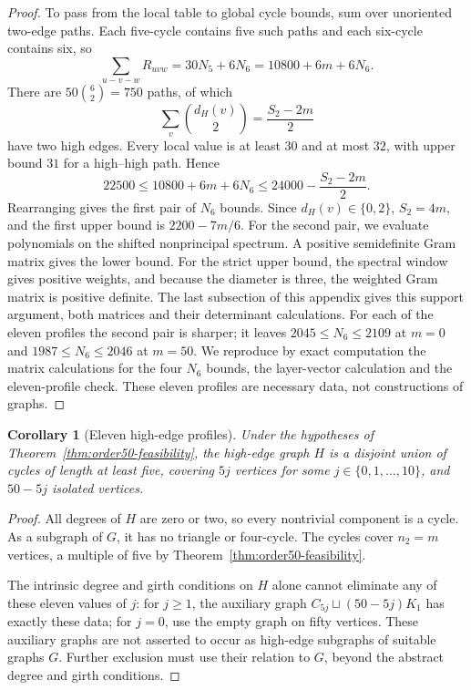 \documentclass[a4paper,10pt,reqno]{amsart}
\theoremstyle{plain}
\newtheorem{corollary}[theorem]{Corollary}
\theoremstyle{definition}
\theoremstyle{remark}
\begin{document}
\begin{proof}
To pass from the local table to global cycle bounds, sum over unoriented
two-edge paths.
Each five-cycle contains five such paths and each six-cycle contains six,
so
\[
 \sum_{u-v-w}R_{uvw}=30N_5+6N_6
                   =10800+6m+6N_6.
\]
There are \(50\binom62=750\) paths, of which
\[
 \sum_v\binom{d_H(v)}2=\frac{S_2-2m}{2}
\]
have two high edges. Every local value is at least \(30\) and at most
\(32\), with upper bound \(31\) for a high--high path. Hence
\[
 22500\le10800+6m+6N_6
 \le24000-\frac{S_2-2m}{2}.
\]
Rearranging gives the first pair of \(N_6\) bounds.
Since \(d_H(v)\in\{0,2\}\), \(S_2=4m\), and the first upper bound is
\(2200-7m/6\).
For the second pair, we evaluate polynomials on the shifted nonprincipal
spectrum. A positive semidefinite Gram matrix gives the lower bound. For the
strict upper bound, the spectral window gives positive weights, and because
the diameter is three, the weighted Gram matrix is positive definite.
The last subsection of this appendix gives this support argument, both
matrices and their determinant calculations.
For each of the eleven profiles the second pair is sharper; it leaves
\(2045\le N_6\le2109\) at \(m=0\) and \(1987\le N_6\le2046\) at \(m=50\).
We reproduce by exact computation the matrix calculations for the four
$N_6$ bounds, the layer-vector calculation and the eleven-profile check.
These eleven profiles are necessary data, not constructions of graphs.
\end{proof}


\begin{corollary}[Eleven high-edge profiles]\label{cor:high-edge-profile-filter}
Under the hypotheses of Theorem~\ref{thm:order50-feasibility}, the high-edge
graph $H$ is a disjoint union of cycles of length at least five, covering
$5j$ vertices for some $j\in\{0,1,\ldots,10\}$, and $50-5j$ isolated
vertices.
\end{corollary}
\begin{proof}
All degrees of $H$ are zero or two, so every nontrivial component is a
cycle. As a subgraph of $G$, it has no triangle or four-cycle.
The cycles cover $n_2=m$ vertices, a multiple of five by
Theorem~\ref{thm:order50-feasibility}.

The intrinsic degree and girth conditions on $H$ alone cannot eliminate
any of these eleven values of $j$: for $j\ge1$, the auxiliary graph
$C_{5j}\sqcup(50-5j)K_1$ has exactly these data; for $j=0$, use the empty
graph on fifty vertices. These auxiliary graphs are not asserted to occur
as high-edge subgraphs of suitable graphs $G$. Further exclusion must use
their relation to $G$, beyond the abstract degree and girth conditions.
\end{proof}
\end{document}
